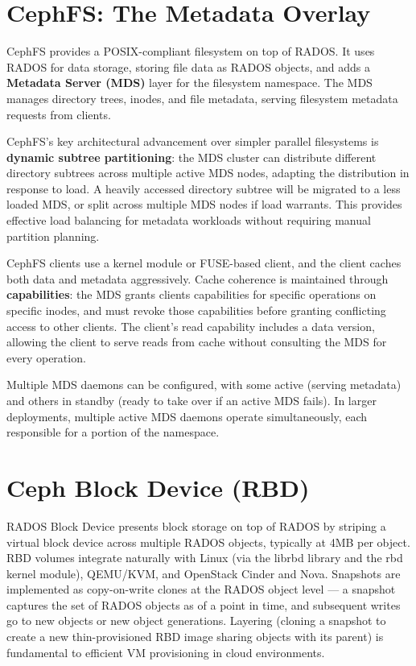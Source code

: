 \section{CephFS: The Metadata Overlay}
CephFS provides a POSIX-compliant filesystem on top of RADOS. It uses RADOS for data storage, storing file data as RADOS objects, and adds a \textbf{Metadata Server (MDS)} layer for the filesystem namespace. The MDS manages directory trees, inodes, and file metadata, serving filesystem metadata requests from clients.

CephFS's key architectural advancement over simpler parallel filesystems is \textbf{dynamic subtree partitioning}: the MDS cluster can distribute different directory subtrees across multiple active MDS nodes, adapting the distribution in response to load. A heavily accessed directory subtree will be migrated to a less loaded MDS, or split across multiple MDS nodes if load warrants. This provides effective load balancing for metadata workloads without requiring manual partition planning.

CephFS clients use a kernel module or FUSE-based client, and the client caches both data and metadata aggressively. Cache coherence is maintained through \textbf{capabilities}: the MDS grants clients capabilities for specific operations on specific inodes, and must revoke those capabilities before granting conflicting access to other clients. The client's read capability includes a data version, allowing the client to serve reads from cache without consulting the MDS for every operation.

Multiple MDS daemons can be configured, with some active (serving metadata) and others in standby (ready to take over if an active MDS fails). In larger deployments, multiple active MDS daemons operate simultaneously, each responsible for a portion of the namespace.

\section{Ceph Block Device (RBD)}
RADOS Block Device presents block storage on top of RADOS by striping a virtual block device across multiple RADOS objects, typically at 4MB per object. RBD volumes integrate naturally with Linux (via the librbd library and the rbd kernel module), QEMU/KVM, and OpenStack Cinder and Nova. Snapshots are implemented as copy-on-write clones at the RADOS object level --- a snapshot captures the set of RADOS objects as of a point in time, and subsequent writes go to new objects or new object generations. Layering (cloning a snapshot to create a new thin-provisioned RBD image sharing objects with its parent) is fundamental to efficient VM provisioning in cloud environments.

